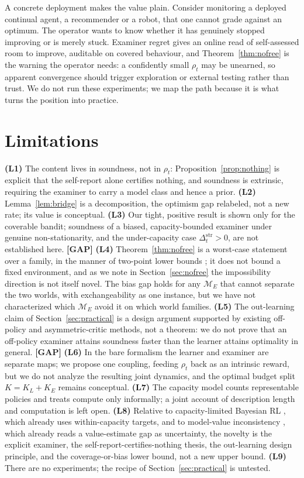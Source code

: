\documentclass[10pt]{article} %
\theoremstyle{definition}
\theoremstyle{plain}
\newcommand{\ModE}{\mathcal{M}_E}
\newcommand{\Dstruct}{\Delta^{\mathrm{str}}}
\begin{document}
A concrete deployment makes the value plain. Consider monitoring a deployed continual agent, a recommender or a robot, that one cannot grade against an optimum. The operator wants to know whether it has genuinely stopped improving or is merely stuck. Examiner regret gives an online read of self-assessed room to improve, auditable on covered behaviour, and Theorem~\ref{thm:nofree} is the warning the operator needs: a confidently small $\rho_t$ may be unearned, so apparent convergence should trigger exploration or external testing rather than trust. We do not run these experiments; we map the path because it is what turns the position into practice.

\section{Limitations}
\label{sec:limits}

\textbf{(L1)} The content lives in soundness, not in $\rho_t$: Proposition~\ref{prop:nothing} is explicit that the self-report alone certifies nothing, and soundness is extrinsic, requiring the examiner to carry a model class and hence a prior. \textbf{(L2)} Lemma~\ref{lem:bridge} is a decomposition, the optimism gap relabeled, not a new rate; its value is conceptual. \textbf{(L3)} Our tight, positive result is shown only for the coverable bandit; soundness of a biased, capacity-bounded examiner under genuine non-stationarity, and the under-capacity case $\Dstruct_t > 0$, are not established here. \textbf{[GAP]} \textbf{(L4)} Theorem~\ref{thm:nofree} is a worst-case statement over a family, in the manner of two-point lower bounds \citep{lai1985asymptotically,azar2017minimax}; it does not bound a fixed environment, and as we note in Section~\ref{sec:nofree} the impossibility direction is not itself novel. The bias gap holds for any $\ModE$ that cannot separate the two worlds, with exchangeability as one instance, but we have not characterized which $\ModE$ avoid it on which world families. \textbf{(L5)} The out-learning claim of Section~\ref{sec:practical} is a design argument supported by existing off-policy and asymmetric-critic methods, not a theorem: we do not prove that an off-policy examiner attains soundness faster than the learner attains optimality in general. \textbf{[GAP]} \textbf{(L6)} In the bare formalism the learner and examiner are separate maps; we propose one coupling, feeding $\rho_t$ back as an intrinsic reward, but we do not analyze the resulting joint dynamics, and the optimal budget split $K = K_L + K_E$ remains conceptual. \textbf{(L7)} The capacity model counts representable policies and treats compute only informally; a joint account of description length and computation is left open. \textbf{(L8)} Relative to capacity-limited Bayesian RL \citep{arumugam2024capacity}, which already uses within-capacity targets, and to model-value inconsistency \citep{filos2022modelvalue}, which already reads a value-estimate gap as uncertainty, the novelty is the explicit examiner, the self-report-certifies-nothing thesis, the out-learning design principle, and the coverage-or-bias lower bound, not a new upper bound. \textbf{(L9)} There are no experiments; the recipe of Section~\ref{sec:practical} is untested.
\end{document}
